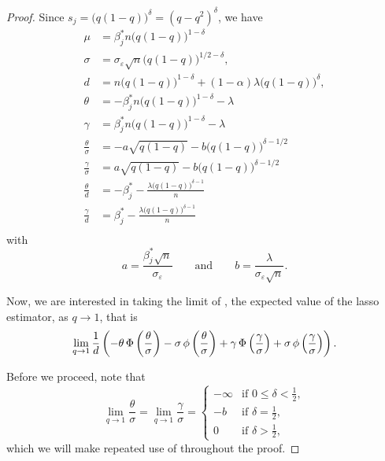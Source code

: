 \begin{proof}

  Since \(s_j = \big(q(1-q)\big)^\delta = (q - q^2)^\delta\), we have
  \[
    \begin{aligned}
      \mu                   & = \beta_j^* n \big(q(1-q)\big)^{1 - \delta}                                       \\
      \sigma                & = \sigma_\varepsilon \sqrt{n} \big(q(1-q)\big)^{1/2 - \delta},                    \\
      d                     & = n \big(q(1-q)\big)^{1 - \delta} + (1 - \alpha) \lambda \big(q(1-q)\big)^\delta, \\
      \theta                & = -\beta^*_j n \big(q(1-q)\big)^{1-\delta} - \lambda                              \\
      \gamma                & = \beta^*_j n \big(q(1-q)\big)^{1-\delta} - \lambda                               \\
      \frac{\theta}{\sigma} & = -a \sqrt{q(1-q)} - b \big(q(1-q)\big)^{\delta - 1/2}                            \\
      \frac{\gamma}{\sigma} & = a \sqrt{q(1-q)} - b \big(q(1-q)\big)^{\delta - 1/2}                             \\
      \frac{\theta}{d}      & = -\beta_j^* - \frac{\lambda \big(q(1-q)\big)^{\delta - 1}}{n}                    \\
      \frac{\gamma}{d}      & = \beta_j^* - \frac{\lambda \big(q(1-q)\big)^{\delta - 1}}{n}                     \\
    \end{aligned}
  \]
  with
  \[
    a = \frac{\beta_j^* \sqrt{n}}{\sigma_\varepsilon} \qquad \text{and} \qquad b = \frac{\lambda}{\sigma_\varepsilon \sqrt{n}}.
  \]

  Now, we are interested in taking the limit of , the expected value of the lasso estimator, as \(q \rightarrow 1\), that is
  \begin{equation}
    \label{eq:eval-qlimit}
    \lim_{q \rightarrow 1}\frac{1}{d}\left(-\theta \operatorname{\Phi}\left(\frac{\theta}{\sigma}\right) - \sigma \operatorname{\phi}\left(\frac{\theta}{\sigma}\right) + \gamma \operatorname{\Phi}\left(\frac{\gamma}{\sigma}\right) + \sigma \operatorname{\phi}\left(\frac{\gamma}{\sigma}\right)\right).
  \end{equation}

  Before we proceed, note that
  \begin{equation}
    \label{eq:eval-sigma-limits}
    \lim_{q \rightarrow 1} \frac{\theta}{\sigma} = \lim_{q \rightarrow 1} \frac{\gamma}{\sigma} =
    \begin{cases}
      -\infty & \text{if } 0 \leq \delta < \frac{1}{2}, \\
      -b      & \text{if } \delta = \frac{1}{2},        \\
      0       & \text{if } \delta > \frac{1}{2},
    \end{cases}
  \end{equation}
  which we will make repeated use of throughout the proof.


\end{proof}
